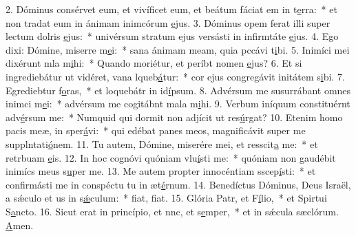 2. Dóminus consérvet eum, et vivíficet eum, et beátum fáciat em in t\uline{e}rra:~* et non tradat eum in ánimam inimcórum \uline{e}jus.
3. Dóminus opem ferat illi super lectum dolris \uline{e}jus:~* univérsum stratum ejus versásti in infirmtáte \uline{e}jus.
4. Ego dixi: Dómine, miserre m\uline{e}i:~* sana ánimam meam, quia pccávi t\uline{i}bi.
5. Inimíci mei dixérunt mla m\uline{i}hi:~* Quando moriétur, et períbt nomen \uline{e}jus?
6. Et si ingrediebátur ut vidéret, vana lqueb\uline{á}tur:~* cor ejus congregávit initátem s\uline{i}bi.
7. Egrediebtur f\uline{o}ras,~* et loquebátr in id\uline{í}psum.
8. Advérsum me susurrábant omnes inimci m\uline{e}i:~* advérsum me cogitábnt mala m\uline{i}hi.
9. Verbum iníquum constituérnt adv\uline{é}rsum me:~* Numquid qui dormit non adjícit ut res\uline{ú}rgat?
10. Etenim homo pacis meæ, in  sper\uline{á}vi:~* qui edébat panes meos, magnificávit super me supplntati\uline{ó}nem.
11. Tu autem, Dómine, miserére mei, et resscit\uline{a} me:~* et retrbuam \uline{e}is.
12. In hoc cognóvi quóniam vlu\uline{í}sti me:~* quóniam non gaudébit inimícs meus s\uline{u}per me.
13. Me autem propter innocéntiam sscep\uline{í}sti:~* et confirmásti me in conspéctu tu in æt\uline{é}rnum.
14. Benedíctus Dóminus, Deus Israël, a sǽculo et us in s\uline{ǽ}culum:~* fiat, f\uline{i}at.
15. Glória Patr, et F\uline{í}lio,~* et Spirtui S\uline{a}ncto.
16. Sicut erat in princípio, et nnc, et s\uline{e}mper,~* et in sǽcula sæclórum. \uline{A}men.

